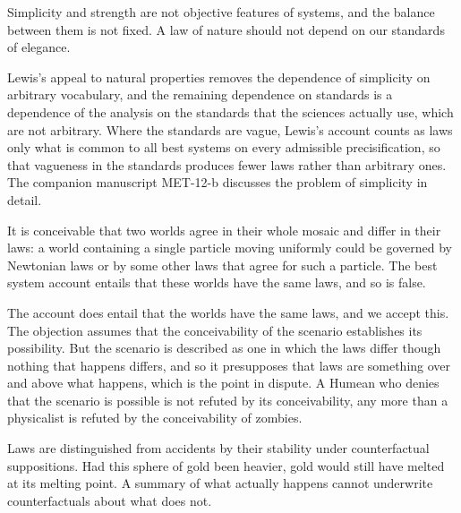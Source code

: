 \documentclass{situationist-preprint}
\begin{document}
\begin{objection}\label{o:simplicity}
Simplicity and strength are not objective features of systems, and the balance between them is not fixed. A law of nature should not depend on our standards of elegance.
\end{objection}

\begin{reply}
Lewis's appeal to natural properties removes the dependence of simplicity on arbitrary vocabulary, and the remaining dependence on standards is a dependence of the analysis on the standards that the sciences actually use, which are not arbitrary. Where the standards are vague, Lewis's account counts as laws only what is common to all best systems on every admissible precisification, so that vagueness in the standards produces fewer laws rather than arbitrary ones. The companion manuscript MET-12-b discusses the problem of simplicity in detail.
\end{reply}

\begin{objection}\label{o:same}
It is conceivable that two worlds agree in their whole mosaic and differ in their laws: a world containing a single particle moving uniformly could be governed by Newtonian laws or by some other laws that agree for such a particle. The best system account entails that these worlds have the same laws, and so is false.
\end{objection}

\begin{reply}
The account does entail that the worlds have the same laws, and we accept this. The objection assumes that the conceivability of the scenario establishes its possibility. But the scenario is described as one in which the laws differ though nothing that happens differs, and so it presupposes that laws are something over and above what happens, which is the point in dispute. A Humean who denies that the scenario is possible is not refuted by its conceivability, any more than a physicalist is refuted by the conceivability of zombies.
\end{reply}

\begin{objection}
Laws are distinguished from accidents by their stability under counterfactual suppositions. Had this sphere of gold been heavier, gold would still have melted at its melting point. A summary of what actually happens cannot underwrite counterfactuals about what does not.
\end{objection}
\end{document}

